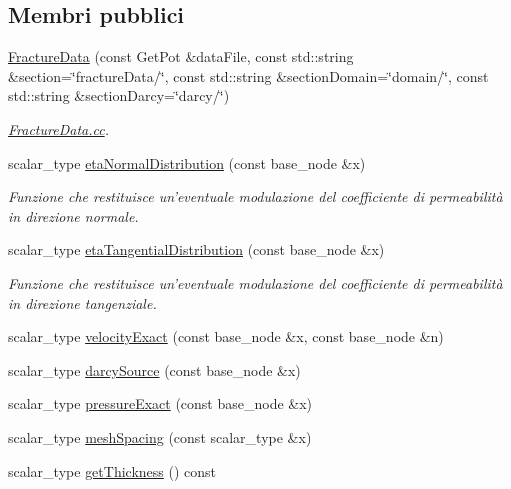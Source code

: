 \subsection*{Membri pubblici}
\begin{DoxyCompactItemize}
\item 
\hyperlink{classFractureData_a116e08af0f48b18afc26ebcbb2818e8c}{Fracture\-Data} (const Get\-Pot \&data\-File, const std\-::string \&section=\char`\"{}fracture\-Data/\char`\"{}, const std\-::string \&section\-Domain=\char`\"{}domain/\char`\"{}, const std\-::string \&section\-Darcy=\char`\"{}darcy/\char`\"{})
\begin{DoxyCompactList}\small\item\em \hyperlink{FractureData_8cc}{Fracture\-Data.\-cc}. \end{DoxyCompactList}\item 
scalar\-\_\-type \hyperlink{classFractureData_a0aaeeb3d9eedd46175759cd6b9536484}{eta\-Normal\-Distribution} (const base\-\_\-node \&x)
\begin{DoxyCompactList}\small\item\em Funzione che restituisce un'eventuale modulazione del coefficiente di permeabilità in direzione normale. \end{DoxyCompactList}\item 
scalar\-\_\-type \hyperlink{classFractureData_a0f989b64832a1f0fc77632c6803f102c}{eta\-Tangential\-Distribution} (const base\-\_\-node \&x)
\begin{DoxyCompactList}\small\item\em Funzione che restituisce un'eventuale modulazione del coefficiente di permeabilità in direzione tangenziale. \end{DoxyCompactList}\item 
scalar\-\_\-type \hyperlink{classFractureData_a8342142df05ded99f3a6c8d39dbfdc0e}{velocity\-Exact} (const base\-\_\-node \&x, const base\-\_\-node \&n)
\item 
scalar\-\_\-type \hyperlink{classFractureData_a8f935d962ae1bd93ca3e3b0955517db5}{darcy\-Source} (const base\-\_\-node \&x)
\item 
scalar\-\_\-type \hyperlink{classFractureData_aa90769a75aff6485824ecd2090c8b4ee}{pressure\-Exact} (const base\-\_\-node \&x)
\item 
scalar\-\_\-type \hyperlink{classFractureData_ab79d66dd830b6e1c55ade0d940c5c8cf}{mesh\-Spacing} (const scalar\-\_\-type \&x)
\item 
scalar\-\_\-type \hyperlink{classFractureData_a3ecc0d132f9cc105af6b24d676a7b9c5}{get\-Thickness} () const 

\end{DoxyCompactItemize}
